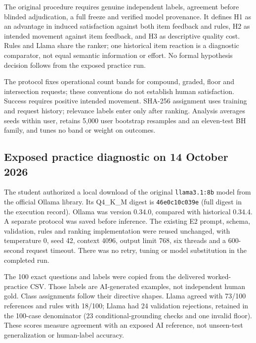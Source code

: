 \documentclass[conference]{IEEEtran}
\begin{document}
The original procedure requires genuine independent labels, agreement before blinded adjudication, a full freeze and verified model provenance. It defines H1 as an advantage in induced satisfaction against both item feedback and rules, H2 as intended movement against item feedback, and H3 as descriptive quality cost. Rules and Llama share the ranker; one historical item reaction is a diagnostic comparator, not equal semantic information or effort. No formal hypothesis decision follows from the exposed practice run.

The protocol fixes operational count bands for compound, graded, floor and intersection requests; these conventions do not establish human satisfaction. Success requires positive intended movement. SHA-256 assignment uses training and request history; relevance labels enter only after ranking. Analysis averages seeds within user, retains 5,000 user bootstrap resamples and an eleven-test BH family, and tunes no band or weight on outcomes.


\subsection{Exposed practice diagnostic on 14 October 2026}
The student authorized a local download of the original \texttt{llama3.1:8b} model from the official Ollama library. Its Q4\_K\_M digest is \texttt{46e0c10c039e} (full digest in the execution record). Ollama was version 0.34.0, compared with historical 0.34.4. A separate protocol was saved before inference. The existing E2 prompt, schema, validation, rules and ranking implementation were reused unchanged, with temperature 0, seed 42, context 4096, output limit 768, six threads and a 600-second request timeout. There was no retry, tuning or model substitution in the completed run.

The 100 exact questions and labels were copied from the delivered worked-practice CSV. Those labels are AI-generated examples, not independent human gold. Class assignments follow their directive shapes. Llama agreed with 73/100 references and rules with 18/100; Llama had 24 validation rejections, retained in the 100-case denominator (23 conditional-grounding checks and one invalid floor). These scores measure agreement with an exposed AI reference, not unseen-test generalization or human-label accuracy.
\end{document}
